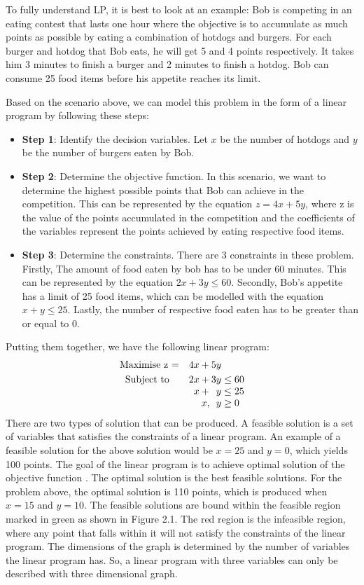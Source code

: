 To fully understand LP, it is best to look at an example: Bob is competing in
an eating contest that lasts one hour where the objective is to accumulate as much points as possible by eating a combination of hotdogs and burgers.
For each burger and hotdog that Bob eats, he will get 5 and 4 points respectively. It takes him 3 minutes to finish a burger and
2 minutes to finish a hotdog. Bob can consume 25 food items before his appetite reaches its limit.

Based on the scenario above, we can model this problem in the form of a linear program by following these steps:
\begin{itemize}
\item \textbf{Step 1}: Identify the decision variables. Let \(x\) be the number of hotdogs and \(y\) be the number
of burgers eaten by Bob.
\item \textbf{Step 2}: Determine the objective function. In this scenario, we want to determine the highest possible
points that Bob can achieve in the competition. This can be represented by the equation \(z = 4x + 5y\), where
z is the value of the points accumulated in the competition and the coefficients of the variables represent the points achieved by eating respective
food items.
\item \textbf{Step 3}: Determine the constraints. There are 3 constraints in these problem. Firstly, The amount of
food eaten by bob has to be under 60 minutes. This can be represented by the equation \(2x + 3y \leq 60\). Secondly,
Bob's appetite has a limit of 25 food items, which can be modelled with the equation \(x + y \leq 25\). Lastly,
the number of respective food eaten has to be greater than or equal to 0.
\end{itemize}
Putting them together, we have the following linear program:
\[
  \begin{array}{r@{}r@{}l}
    \text{Maximise z =} \quad &{}4x + 5y \\[\jot]
    \text{Subject to}\qquad &{} 2x +   3y &{} \leq 60 \\
    \qquad &{} x +   \phantom{2}y &{} \leq 25 \\
    \qquad &{} x ,   \phantom{2}y &{} \geq 0 \\
  \end{array}
\]
There are two types of solution that can be produced. A feasible solution is a set of variables that satisfies the constraints
of a linear program. An example of a feasible solution for the above solution would be \(x = 25\) and \(y=0\), which yields 100 points.
The goal of the linear program is to achieve optimal solution of the objective function \cite{LPChvatal}. The optimal solution is the best feasible solutions.
For the problem above, the optimal solution is 110 points, which is produced when \(x = 15\) and \(y = 10\). The feasible solutions
are bound within the feasible region marked in green as shown in Figure 2.1. The red region is the infeasible region, where any point that falls within it will not satisfy the
constraints of the linear program. The dimensions of the graph is determined by the number of variables the linear program has.
So, a linear program with three variables can only be described with three dimensional graph.

